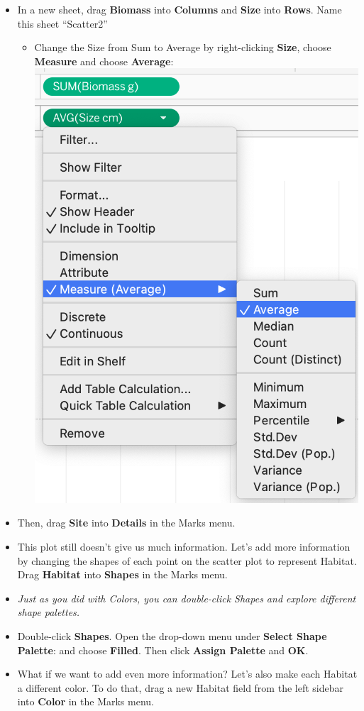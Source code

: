 \documentclass[
]{book}
\providecommand{\tightlist}{%
  \setlength{\itemsep}{0pt}\setlength{\parskip}{0pt}}
\begin{document}
\begin{enumerate}
  \begin{itemize}
  \tightlist
  \item
    In a new sheet, drag \textbf{Biomass} into \textbf{Columns} and \textbf{Size} into \textbf{Rows}. Name this sheet ``Scatter2''

    \begin{itemize}
    \tightlist
    \item
      Change the Size from Sum to Average by right-clicking \textbf{Size}, choose \textbf{Measure} and choose \textbf{Average}:
      \includegraphics{images/M3S3-scatter-change-size.png}
    \end{itemize}
  \item
    Then, drag \textbf{Site} into \textbf{Details} in the Marks menu.
  \item
    This plot still doesn't give us much information. Let's add more information by changing the shapes of each point on the scatter plot to represent Habitat. Drag \textbf{Habitat} into \textbf{Shapes} in the Marks menu.
  \item
    \emph{Just as you did with Colors, you can double-click Shapes and explore different shape palettes. }
  \item
    Double-click \textbf{Shapes}. Open the drop-down menu under \textbf{Select Shape Palette}: and choose \textbf{Filled}. Then click \textbf{Assign Palette} and \textbf{OK}.
  \item
    What if we want to add even more information? Let's also make each Habitat a different color. To do that, drag a new Habitat field from the left sidebar into \textbf{Color} in the Marks menu.


\end{itemize}
\end{enumerate}
\end{document}
